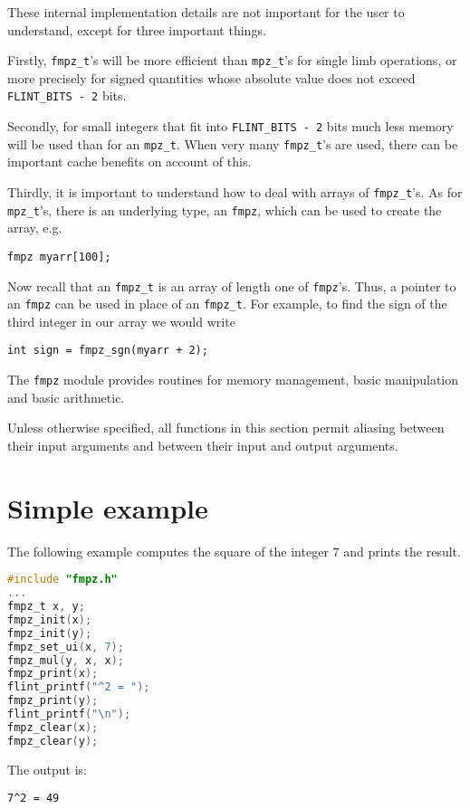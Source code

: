 \documentclass[a4paper,10pt]{book}
\newcommand{\code}{\lstinline}
\begin{document}
{{These internal implementation details are not important for the user to
understand, except for three important things.

Firstly, \code{fmpz_t}'s will be more efficient than \code{mpz_t}'s for
single limb operations, or more precisely for signed quantities whose
absolute value does not exceed \code{FLINT_BITS - 2} bits.

Secondly, for small integers that fit into \code{FLINT_BITS - 2} bits
much less memory will be used than for an \code{mpz_t}.  When very many
\code{fmpz_t}'s are used, there can be important cache benefits on
account of this.

Thirdly, it is important to understand how to deal with arrays of
\code{fmpz_t}'s.  As for \code{mpz_t}'s, there is an underlying type,
an \code{fmpz}, which can be used to create the array, e.g.\
\begin{lstlisting}
fmpz myarr[100];
\end{lstlisting}
Now recall that an \code{fmpz_t} is an array of length one of \code{fmpz}'s.
Thus, a pointer to an \code{fmpz} can be used in place of an \code{fmpz_t}.
For example, to find the sign of the third integer in our array we would
write
\begin{lstlisting}
int sign = fmpz_sgn(myarr + 2);
\end{lstlisting}

The \code{fmpz} module provides routines for memory management, basic
manipulation and basic arithmetic.

Unless otherwise specified, all functions in this section permit aliasing
between their input arguments and between their input and output
arguments.

\section{Simple example}

The following example computes the square of the integer $7$ and prints
the result.
\begin{lstlisting}[language=c]
#include "fmpz.h"
...
fmpz_t x, y;
fmpz_init(x);
fmpz_init(y);
fmpz_set_ui(x, 7);
fmpz_mul(y, x, x);
fmpz_print(x);
flint_printf("^2 = ");
fmpz_print(y);
flint_printf("\n");
fmpz_clear(x);
fmpz_clear(y);
\end{lstlisting}

The output is:
\begin{lstlisting}
7^2 = 49
\end{lstlisting}

}}
\end{document}
